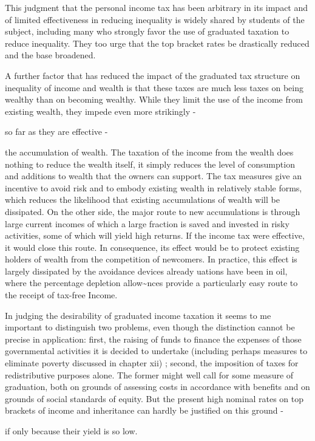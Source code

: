\documentclass[11pt,openany]{book}
\begin{document}
This judgment that the personal income tax has been arbitrary in its impact and of limited effectiveness in reducing inequality is widely shared by students of the subject, including many who strongly favor the use of graduated taxation to reduce inequality. They too urge that the top bracket rates be drastically reduced and the base broadened.

A further factor that has reduced the impact of the graduated tax structure on inequality of income and wealth is that these taxes are much less taxes on being wealthy than on becoming wealthy. While they limit the use of the income from existing wealth, they impede even more strikingly -

so far as they are effective -

the accumulation of wealth. The taxation of the income from the wealth does nothing to reduce the wealth itself, it simply reduces the level of consumption and additions to wealth that the owners can support. The tax measures give an incentive to avoid risk and to embody existing wealth in relatively stable forms, which reduces the likelihood that existing accumulations of wealth will be dissipated. On the other side, the major route to new accumulations is through large current incomes of which a large fraction is saved and invested in risky activities, some of which will yield high returns. If the income tax were effective, it would close this route. In consequence, its effect would be to protect existing holders of wealth from the competition of newcomers. In practice, this effect is largely dissipated by the avoidance devices already uations have been in oil, where the percentage depletion allow\textasciitilde{}nces provide a particularly easy route to the receipt of tax-free Income.

In judging the desirability of graduated income taxation it seems to me important to distinguish two problems, even though the distinction cannot be precise in application: first, the raising of funds to finance the expenses of those governmental activities it is decided to undertake (including perhaps measures to eliminate poverty discussed in chapter xii) ; second, the imposition of taxes for redistributive purposes alone. The former might well call for some measure of graduation, both on grounds of assessing costs in accordance with benefits and on grounds of social standards of equity. But the present high nominal rates on top brackets of income and inheritance can hardly be justified on this ground -

if only because their yield is so low.
\end{document}
